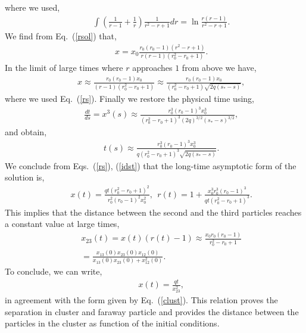 where we used,
\begin{eqnarray}&&\!\!\!\!\!\!\!\!\!\!\!\!\!\!\!\!
\int\left(\frac{1}{r-1}+\frac{1}{r}\right)\frac{1}{r^2\!-\!r\!+\!1}dr=\ln\frac{r(r-1)}{r^2\!-\!r\!+\!1}.
\end{eqnarray}
We find from Eq.~(\ref{rsol}) that,
\begin{eqnarray}&&\!\!\!\!\!\!\!\!\!\!\!\!\!\!\!\!
x=x_0\frac{r_0(r_0-1)(r^2\!-\!r\!+\!1)}{r(r-1)(r_0^2\!-\!r_0\!+\!1)}.
\end{eqnarray}
In the limit of large times where $r$ approaches $1$ from above we have,
\begin{eqnarray}&&\!\!\!\!\!\!\!\!\!\!\!\!\!\!\!\!
x\approx \frac{r_0(r_0-1)x_0}{(r-1)(r_0^2\!-\!r_0\!+\!1)}\approx \frac{r_0(r_0-1)x_0}{(r_0^2\!-\!r_0\!+\!1)\sqrt{2q(s_*-s)}}, \label{idst}
\end{eqnarray}
where we used Eq.~(\ref{rs}). Finally we restore the physical time using,
\begin{eqnarray}&&\!\!\!\!\!\!\!\!\!\!\!\!\!\!\!\!
\frac{dt}{ds}=x^3(s)\approx \frac{r_0^3(r_0-1)^3x_0^3}{(r_0^2\!-\!r_0\!+\!1)^3(2q)^{3/2}(s_*-s)^{3/2}},
\end{eqnarray}
and obtain,
\begin{eqnarray}&&\!\!\!\!\!\!\!\!\!\!\!\!\!\!\!\!
t(s)\approx \frac{r_0^3(r_0-1)^3x_0^3}{q(r_0^2\!-\!r_0\!+\!1)^3\sqrt{2q(s_*-s)}}.
\end{eqnarray}
We conclude from Eqs.~(\ref{rs}), (\ref{idst}) that the long-time asymptotic form of the solution is,
\begin{eqnarray}&&\!\!\!\!\!\!\!\!\!\!\!\!\!\!\!\!
x(t)=\frac{qt(r_0^2\!-\!r_0\!+\!1)^2}{r_0^2(r_0-1)^2x_0^2},\ \ r(t)=1+\frac{x_0^3r_0^3(r_0-1)^3}{qt(r_0^2\!-\!r_0\!+\!1)^3}.
\end{eqnarray}
This implies that the distance between the second and the third particles reaches a constant value at large times,
\begin{eqnarray}&&\!\!\!\!\!\!\!\!\!\!\!\!\!\!\!\!
x_{23}(t)=x(t)(r(t)-1)\approx \frac{x_0r_0(r_0-1)}{r_0^2\!-\!r_0\!+\!1}\nonumber\\&&\!\!\!\!\!\!\!\!\!\!\!\!\!\!\!\!\!=\frac{x_{13}(0)x_{23}(0)x_{12}(0)}{x_{13}(0)x_{23}(0)\!+\!x^2_{12}(0)}.\label{initial}
\end{eqnarray}
To conclude, we can write,
\begin{eqnarray}&&\!\!\!\!\!\!\!\!\!\!\!\!\!\!\!\!
x(t)=\frac{qt}{x_{23}^2},
\end{eqnarray}
in agreement with the form given by Eq.~(\ref{clust}). This relation proves the separation in cluster and faraway particle and provides the distance between the particles in the cluster as function of the initial conditions.

